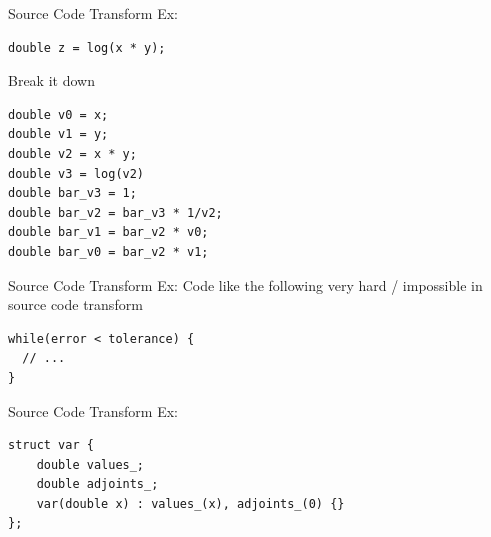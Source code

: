 \documentclass[dvipsnames]{beamer}
\newenvironment{CacheLine}[1][]{
  \begin{tikzpicture}[x=1.2cm,y=0.8cm,font=\footnotesize,>=Stealth,#1]
    \def\CacheH{1.0}   %
    \def\CacheBelow{1.0} %

}{
    \foreach \i in {1,...,7} { \draw[black!40] (\i,0) -- (\i,\CacheH); }
    \draw[line width=0.6pt, rounded corners=2pt] (0,0) rectangle (8,\CacheH);
    \foreach \i in {0,...,7} {
      \node[below=3pt, text=black!75] at (\i+0.5,0) {8B \i};
    }
  \end{tikzpicture}
}
\newcommand{\CacheColor}[2]{%
  \fill[#2, fill opacity=0.35, draw=none] (#1,0) rectangle ++(1,\CacheH);%
}
\newcommand{\CacheMarkBelow}[3][green!60!black]{%
  \draw[-{Stealth[length=3mm]}, very thick, draw=#1] (#2,-\CacheBelow+0.28) -- (#2,0.02);
  \node[below, anchor=west, text=#1] at (#2,-\CacheBelow-0.2) {#3};
}
\newcommand{\CacheSetBelow}[1]{\def\CacheBelow{#1}}
\begin{document}

\begin{frame}[fragile]{Source Code Transform Ex:}
\begin{verbatim}
double z = log(x * y);
\end{verbatim}
Break it down
\begin{verbatim}
double v0 = x;
double v1 = y;
double v2 = x * y;
double v3 = log(v2)
double bar_v3 = 1;
double bar_v2 = bar_v3 * 1/v2;
double bar_v1 = bar_v2 * v0;
double bar_v0 = bar_v2 * v1;
\end{verbatim}
\end{frame}

\begin{frame}[fragile]{Source Code Transform Ex:}
Code like the following very hard / impossible in source code transform
\begin{verbatim}
while(error < tolerance) {
  // ...
}
\end{verbatim}
\end{frame}

\begin{frame}[fragile]{Source Code Transform Ex:}
\begin{verbatim}
struct var {
    double values_;
    double adjoints_;
    var(double x) : values_(x), adjoints_(0) {}
};

\end{verbatim}
\end{frame}
\end{document}
